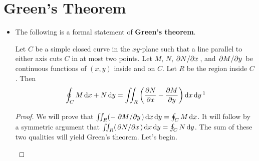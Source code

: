 \documentclass[../main.tex]{subfiles}
\begin{document}
\section{Green's Theorem}
\begin{itemize}
    \item The following is a formal statement of \textbf{Green's theorem}.
    \begin{thm}\label{trm:GreensTheorem}
        Let $C$ be a simple closed curve in the $xy$-plane such that a line parallel to either axis cuts $C$ in at most two points. Let $M$, $N$, $\pdv*{N}{x}$, and $\pdv*{M}{y}$ be continuous functions of $(x,y)$ inside and on $C$. Let $R$ be the region inside $C$. Then
        \begin{equation*}
            \oint_CM\dd{x}+N\dd{y} = \iint_R\left( \pdv{N}{x}-\pdv{M}{y} \right)\dd{x}\dd{y}\footnotemark
        \end{equation*}
        \begin{proof}
            We will prove that $\iint_R(-\pdv*{M}{y})\dd{x}\dd{y}=\oint_CM\dd{x}$. It will follow by a symmetric argument that $\iint_R(\pdv*{N}{x})\dd{x}\dd{y}=\oint_CN\dd{y}$. The sum of these two qualities will yield Green's theorem. Let's begin.
            \begin{figure}[h!]
                \centering
\end{figure}
\end{proof}
\end{thm}
\end{itemize}
\end{document}
